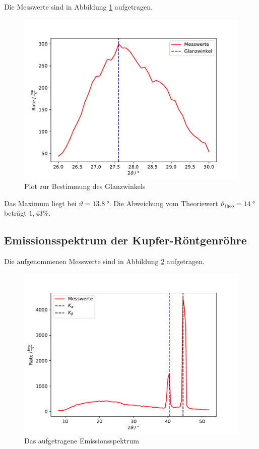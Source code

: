 Die Messwerte sind in Abbildung \ref{fig:bragg} aufgetragen.
\begin{figure}[H]
  \centering
  \includegraphics[width=\textwidth]{Plots/bragg.pdf}
  \caption{Plot zur Bestimmung des Glanzwinkels}
  \label{fig:bragg}
\end{figure}

Das Maximum liegt bei $\vartheta = \SI{13,8}{°}$. Die Abweichung vom Theoriewert $\vartheta_\text{theo} = \SI{14}{°}$ beträgt
$1,43 \%$.

\subsection{Emissionsspektrum der Kupfer-Röntgenröhre}

Die aufgenommenen Messwerte sind in Abbildung \ref{fig:emission} aufgetragen.
\begin{figure}[H]
  \centering
  \includegraphics[width=\textwidth]{Plots/emission.pdf}
  \caption{Das aufgetragene Emissionsspektrum}
  \label{fig:emission}
\end{figure}

